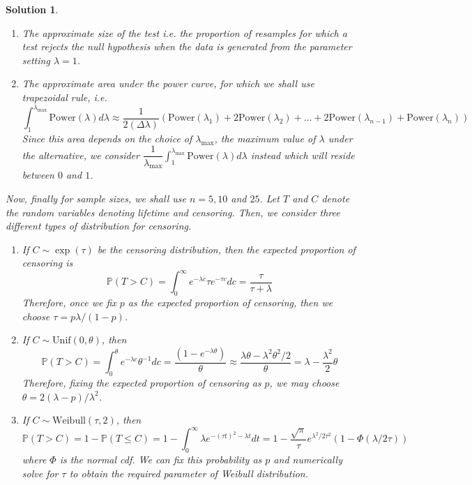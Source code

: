 \documentclass[12pt]{article}
\theoremstyle{problemstyle}
\newtheorem*{solution*}{Solution}
\newcommand{\prob}{\mathbb{P}}
\begin{document}
\begin{solution*}
    \begin{enumerate}
        \item The approximate size of the test i.e. the proportion of resamples for which a test rejects the null hypothesis when the data is generated from the parameter setting $\lambda = 1$.
        \item The approximate area under the power curve, for which we shall use trapezoidal rule, i.e. 
        $$
        \int_1^{\lambda_{\max}} \text{Power}(\lambda) d\lambda \approx \dfrac{1}{2(\Delta \lambda)} \left( \text{Power}(\lambda_1) + 2 \text{Power}(\lambda_2) + \dots + 2\text{Power}(\lambda_{n-1}) + \text{Power}(\lambda_n) \right)
        $$
        \noindent Since this area depends on the choice of $\lambda_{\max}$, the maximum value of $\lambda$ under the alternative, we consider $\dfrac{1}{\lambda_{\max}}\int_1^{\lambda_{\max}} \text{Power}(\lambda) d\lambda$ instead which will reside between $0$ and $1$.
    \end{enumerate}

    Now, finally for sample sizes, we shall use $n = 5, 10$ and $25$. Let $T$ and $C$ denote the random variables denoting lifetime and censoring. Then, we consider three different types of distribution for censoring.

    \begin{enumerate}
        \item If $C \sim \exp(\tau)$ be the censoring distribution, then the expected proportion of censoring is 
        $$
        \prob(T > C) = \int_0^\infty e^{-\lambda c}\tau e^{-\tau c} dc = \dfrac{\tau}{\tau + \lambda}
        $$
        \noindent Therefore, once we fix $p$ as the expected proportion of censoring, then we choose $\tau = p\lambda/(1- p)$.
        \item If $C \sim \text{Unif}(0, \theta)$, then 
        $$
        \prob(T > C) = \int_0^\theta e^{-\lambda c}\theta^{-1} dc = \dfrac{(1 - e^{-\lambda \theta})}{\theta} \approx \dfrac{\lambda \theta - \lambda^2\theta^2/2}{\theta} = \lambda - \dfrac{\lambda^2}{2}\theta
        $$
        \noindent Therefore, fixing the expected proportion of censoring as $p$, we may choose $\theta = 2(\lambda - p)/\lambda^2$.
        \item If $C \sim \text{Weibull}(\tau, 2)$, then 
        $$
        \prob(T > C) = 1 - \prob(T \leq C) = 1 - \int_0^\infty \lambda e^{-(\tau t)^2 - \lambda t} dt = 1 - \dfrac{\sqrt{\pi}}{\tau}e^{\lambda^2/2\tau^2} \left( 1 - \Phi(\lambda/2\tau) \right) 
        $$
        \noindent where $\Phi$ is the normal cdf. We can fix this probability as $p$ and numerically solve for $\tau$ to obtain the required parameter of Weibull distribution.
    \end{enumerate}


\end{solution*}
\end{document}
